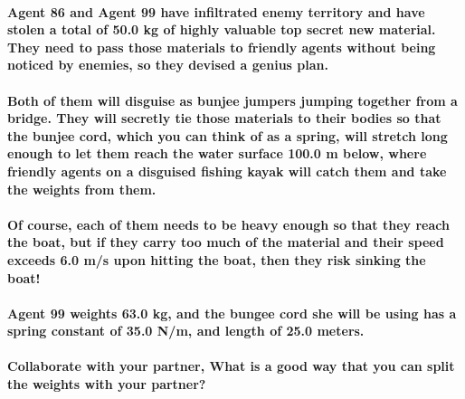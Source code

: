 \paragraph{Agent 86 and Agent 99 have infiltrated enemy territory and have stolen a total of 50.0 kg of highly valuable top secret new material. They need to pass those materials to friendly agents without being noticed by enemies, so they devised a genius plan.\newline}
\paragraph{Both of them will disguise as bunjee jumpers jumping together from a bridge. They will secretly tie those materials to their bodies so that the bunjee cord, which you can think of as a spring, will stretch long enough to let them reach the water surface 100.0 m below, where friendly agents on a disguised fishing kayak will catch them and take the weights from them.\newline}
\paragraph{Of course, each of them needs to be heavy enough so that they reach the boat, but if they carry too much of the material and their speed exceeds 6.0 m/s upon hitting the boat, then they risk sinking the boat!\newline}
\paragraph{Agent 99 weights 63.0 kg, and the bungee cord she will be using has a spring constant of 35.0 N/m, and length of 25.0 meters.\newline}
\paragraph{Collaborate with your partner, What is a good way that you can split the weights with your partner?}